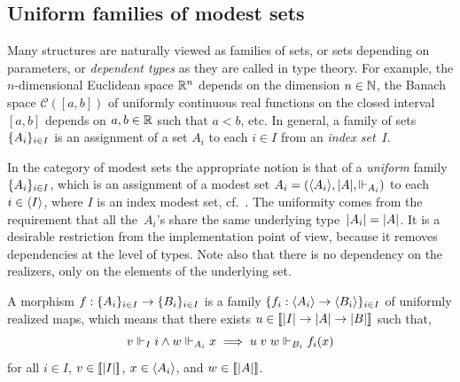 \subsection{Uniform families of modest sets}
\label{sec:uniform-families}

Many structures are naturally viewed as families of sets, or sets
depending on parameters, or \emph{dependent types} as they are called
in type theory. For example, the $n$-dimensional Euclidean space
$\mathbb{R}^n$ depends on the dimension $n \in \mathbb{N}$, the Banach space
$\mathcal{C}([a,b])$ of uniformly continuous real functions on the
closed interval $[a,b]$ depends on $a, b \in \mathbb{R}$ such that $a < b$,
etc. In general, a family of sets $\{A_i\}_{i \in I}$ is an
assignment of a set $A_i$ to each $i \in I$ from an \emph{index
  set}~$I$.

In the category of modest sets the appropriate notion is that of a
\emph{uniform} family~$\{A_i\}_{i \in I}$, which is an assignment
of a modest set $A_i = (\langle A_i \rangle, |A|, {\Vdash_{A_i}})$ to each
$i \in \langle I \rangle$, where $I$ is an index modest set,
cf.~\cite{Jacobs,Birkedal}. The uniformity comes from the requirement
that all the~$A_i$'s share the same underlying type~$|A_i| =
|A|$. It is a desirable restriction from the implementation
point of view, because it removes dependencies at the level of types.
Note also that there is no dependency on the realizers, only on the
elements of the underlying set.

A morphism $f : \{A_i\}_{i \in I} \to \{B_i\}_{i \in I}$ is a
family $\{f_i : \langle A_i \rangle \to \langle B_i \rangle\}_{i \in I}$ of
uniformly realized maps, which means that there exists $u \in
[\![|I| \to |A| \to |B|]\!]$ such that,
%
\begin{equation*}
  v \Vdash_I i \land w \Vdash_{A_i} x \implies u\; v \; w \Vdash_{B_i} f_i(x)
\end{equation*}
%
for all $i \in I$, $v \in [\![|I|]\!]$, $x \in \langle A_i \rangle$,
and $w \in [\![|A|]\!]$.

